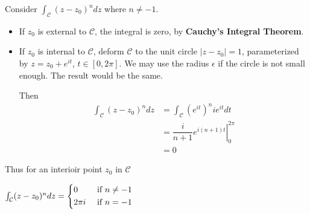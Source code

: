 \documentclass[12pt,titlepage]{article}
\begin{document}
Consider $\int_{\mathcal{C}} (z-z_0)^n dz$ where $n \neq -1$. \begin{itemize}
	\item If $z_0$ is external to $\mathcal{C}$, the integral is zero, by \textbf{Cauchy's Integral Theorem}. 
	\item If $z_0$ is internal to $\mathcal{C}$, deform $\mathcal{C}$ to the unit circle $|z - z_0| = 1$, parameterized by $z = z_0 + e^{it}$, $t \in [0,2\pi]$. We may use the radius $\epsilon$ if the circle is not small enough. The result would be the same. 
	
	Then \begin{align*}
		\int_{\mathcal{C}} (z-z_0)^n dz &= \int_{\mathcal{C}} \left(e^{it}\right)^n i e^{it} dt\\
		&= \left. \dfrac{i}{n+1} e^{i (n+1)t} \right|_0^{2\pi}\\
		&= 0
	\end{align*}
\end{itemize}
Thus for an interioir point $z_0$ in $\mathcal{C}$ \begin{tcolorbox}[hbox, before=\par\smallskip\centering]
	$\int_{\mathcal{C}} (z-z_0)^n dz = \begin{dcases}
		0 & \text{ if } n\neq -1\\
		2\pi i & \text{ if } n= -1
	\end{dcases}$
\end{tcolorbox}
\end{document}
